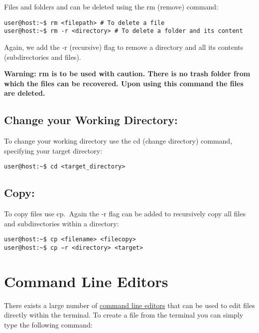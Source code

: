 \documentclass[
]{book}
\begin{document}
Files and folders and can be deleted using the rm (remove) command:

\begin{verbatim}
user@host:~$ rm <filepath> # To delete a file
user@host:~$ rm -r <directory> # To delete a folder and its content
\end{verbatim}

Again, we add the -r (recursive) flag to remove a directory and all its contents (subdirectories and files).

\textbf{Warning: rm is to be used with caution. There is no trash folder
from which the files can be recovered. Upon using this command the files are deleted.}

\hypertarget{change-your-working-directory}{%
\subsection{Change your Working Directory:}\label{change-your-working-directory}}

To change your working directory use the cd (change directory) command, specifying your target directory:

\begin{verbatim}
user@host:~$ cd <target_directory>
\end{verbatim}

\hypertarget{copy}{%
\subsection{Copy:}\label{copy}}

To copy files use cp.~Again the -r flag can be added to recursively copy all files and subdirectories within a directory:

\begin{verbatim}
user@host:~$ cp <filename> <filecopy>
user@host:~$ cp −r <directory> <target>
\end{verbatim}

\hypertarget{command-line-editors}{%
\section{Command Line Editors}\label{command-line-editors}}

There exists a large number of \href{https://en.wikipedia.org/wiki/List_of_text_editors}{command line editors}
that can be used to edit files directly within the terminal.
To create a file from the terminal you can simply type the following command:
\end{document}
